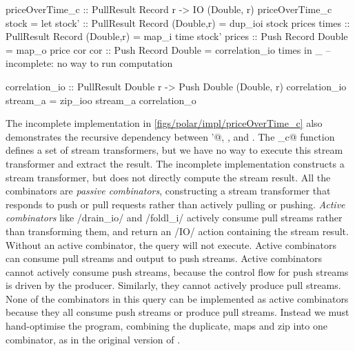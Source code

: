 \begin{haskell}[float,caption={Incomplete polarised implementation of \Hs/priceOverTime_c/},label=figs/polar/impl/priceOverTime_c]
priceOverTime_c :: PullResult Record r -> IO (Double, r)
priceOverTime_c stock =
  let stock' :: PullResult Record (Double,r)
              = dup_ioi stock prices
      times  :: PullResult Record (Double,r)
              = map_i time stock'
      prices :: Push Record Double
              = map_o price cor
      cor    :: Push Record Double
              = correlation_io times
  in _ -- incomplete: no way to run computation

correlation_io :: PullResult Double r -> Push Double (Double, r)
correlation_io stream_a = zip_ioo stream_a correlation_o
\end{haskell}

The incomplete implementation in \cref{figs/polar/impl/priceOverTime_c} also demonstrates the recursive dependency between \Hs@stock'@, \Hs@times@, \Hs@prices@ and \Hs@cor@.
The \Hs@priceOverTime_c@ function defines a set of stream transformers, but we have no way to execute this stream transformer and extract the result.
The incomplete implementation constructs a stream transformer, but does not directly compute the stream result.
All the combinators are \emph{passive combinators}, constructing a stream transformer that responds to push or pull requests rather than actively pulling or pushing.
\emph{Active combinators} like \Hs/drain_io/ and \Hs/foldl_i/ actively consume pull streams rather than transforming them, and return an \Hs/IO/ action containing the stream result.
Without an active combinator, the query will not execute.
Active combinators can consume pull streams and output to push streams.
Active combinators cannot actively consume push streams, because the control flow for push streams is driven by the producer.
Similarly, they cannot actively produce pull streams.
None of the combinators in this query can be implemented as active combinators because they all consume push streams or produce pull streams.
Instead we must hand-optimise the program, combining the duplicate, maps and zip into one combinator, as in the original version of \Hs@priceOverTime@.



